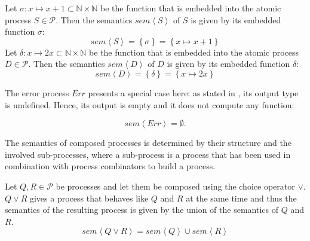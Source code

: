 \begin{example}
  \label{exp:sem_atomic}
  Let $\sigma \colon x \mapsto x+1 \subset \mathbb{N} \times \mathbb{N}$ be the function that is embedded into the atomic process $S \in \mathcal{P}$. Then the semantics $sem \left\langle S \right\rangle$ of $S$ is given by its embedded function $\sigma$:
  \begin{equation}
    sem \left\langle S \right\rangle = \left\{ \sigma \right\} = \left\{ x \mapsto x+1 \right\}
  \end{equation}
  Let $\delta \colon x \mapsto 2x \subset \mathbb{N} \times \mathbb{N}$ be the function that is embedded into the atomic process $D \in \mathcal{P}$. Then the semantics $sem \left\langle D \right\rangle$ of $D$ is given by its embedded function $\delta$:
  \begin{equation}
    sem \left\langle D \right\rangle = \left\{ \delta \right\} = \left\{ x \mapsto 2x \right\}
  \end{equation}
  \hfill\qedsymbol
\end{example}

The error process $Err$ presents a special case here: as stated in , its output type is undefined. Hence, its output is empty and it does not compute any function:
\begin{definition}
  \begin{equation}
    \label{eqn:sem_error}
    sem \left\langle Err \right\rangle = \emptyset.
  \end{equation}
  \hfill\qedsymbol
\end{definition}


The semantics of composed processes is determined by their structure and the involved sub-processes, where a sub-process is a process that has been used in combination with process combinators to build a process. 

\begin{definition}
\label{def:sem_choice}
Let $Q, R \in \mathcal{P}$ be processes and let them be composed using the choice operator $\vee$. $Q \vee R$ gives a process that behaves like $Q$ and $R$ at the same time and thus the semantics of the resulting process is given by the union of the semantics of $Q$ and $R$.
  \begin{equation}
    \label{eqn:sem_choice}
    sem \left\langle Q \vee R \right\rangle = sem \left\langle Q \right\rangle \cup sem \left\langle R \right\rangle
  \end{equation}
  \hfill\qedsymbol
\end{definition}

